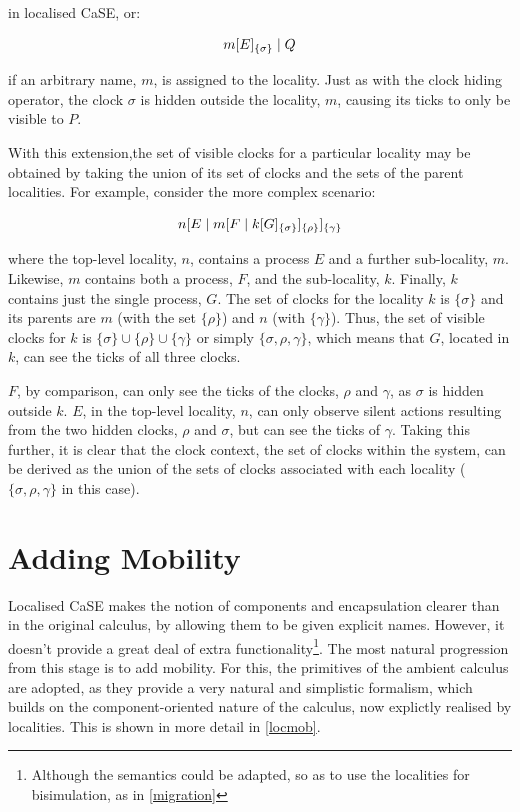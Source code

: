 \noindent in localised CaSE, or:

\begin{equation}
  {m}[ E ]_{\{\sigma\}}\;|\;Q
\end{equation}

\noindent if an arbitrary name, $m$, is assigned to the locality.  Just
as with the clock hiding operator, the clock $\sigma$ is hidden outside
the locality, $m$, causing its ticks to only be visible to $P$.  

With this extension,the set of visible clocks for a particular locality
may be obtained by taking the union of its set of clocks and the sets of
the parent localities.  For example, consider the more complex scenario:

\begin{equation}
{n}[ E\;|\;{m}[ F\;|\;{k}[ G ]_{\{\sigma\}} ]_{\{\rho\}} ]_{\{\gamma\}}
\end{equation}

\noindent where the top-level locality, $n$, contains a process $E$ and
a further sub-locality, $m$.  Likewise, $m$ contains both a process,
$F$, and the sub-locality, $k$.  Finally, $k$ contains just the single
process, $G$.  The set of clocks for the locality $k$ is $\{\sigma\}$
and its parents are $m$ (with the set $\{\rho\}$) and $n$ (with
$\{\gamma\}$).  Thus, the set of visible clocks for $k$ is $\{\sigma\}
\cup \{\rho\} \cup \{\gamma\}$ or simply $\{\sigma, \rho, \gamma\}$,
which means that $G$, located in $k$, can see the ticks of all three
clocks.

$F$, by comparison, can only see the ticks of the clocks, $\rho$ and
$\gamma$, as $\sigma$ is hidden outside $k$.  $E$, in the top-level
locality, $n$, can only observe silent actions resulting from the two
hidden clocks, $\rho$ and $\sigma$, but can see the ticks of $\gamma$.
Taking this further, it is clear that the clock context, the set of
clocks within the system, can be derived as the union of the sets of
clocks associated with each locality ($\{\sigma, \rho, \gamma\}$ in
this case).

\section{Adding Mobility}
\label{addingmob}

Localised CaSE makes the notion of components and encapsulation clearer
than in the original calculus, by allowing them to be given explicit
names.  However, it doesn't provide a great deal of extra
functionality\footnote{Although the semantics could be adapted, so as to
use the localities for bisimulation, as in \ref{migration}}.  The most
natural progression from this stage is to add mobility.  For this, the
primitives of the ambient calculus are adopted, as they provide a very
natural and simplistic formalism, which builds on the component-oriented
nature of the calculus, now explictly realised by localities.  This is
shown in more detail in \ref{locmob}.

